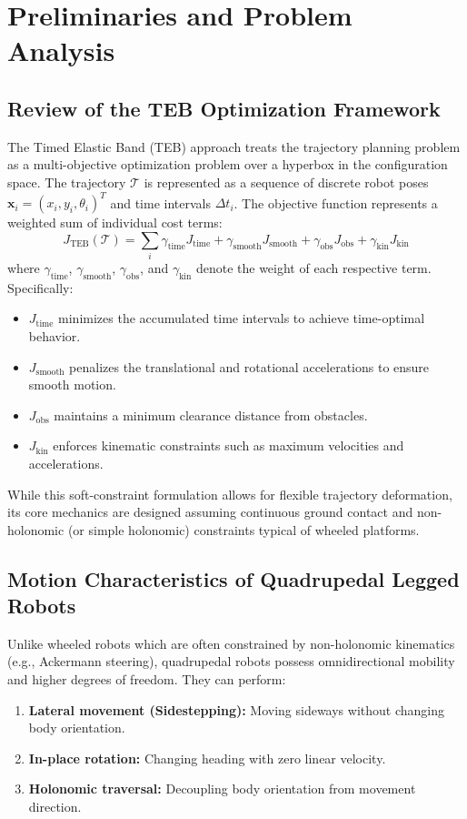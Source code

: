 \documentclass[lettersize,journal]{IEEEtran}
\begin{document}
\section{Preliminaries and Problem Analysis}

\subsection{Review of the TEB Optimization Framework}
The Timed Elastic Band (TEB) approach \cite{rosmannTrajectoryOptimizationUsing2017} treats the trajectory planning problem as a multi-objective optimization problem over a hyperbox in the configuration space. The trajectory $\mathcal{T}$ is represented as a sequence of discrete robot poses $\mathbf{x}_i = (x_i, y_i, \theta_i)^T$ and time intervals $\Delta t_i$. The objective function represents a weighted sum of individual cost terms:
\begin{equation}
J_{\text{TEB}}(\mathcal{T}) = \sum_i \gamma_{\text{time}} J_{\text{time}} + \gamma_{\text{smooth}} J_{\text{smooth}} + \gamma_{\text{obs}} J_{\text{obs}} + \gamma_{\text{kin}} J_{\text{kin}}
\end{equation}
where $\gamma_{\text{time}}$, $\gamma_{\text{smooth}}$, $\gamma_{\text{obs}}$, and $\gamma_{\text{kin}}$ denote the weight of each respective term. Specifically:
\begin{itemize}
\item $J_{\text{time}}$ minimizes the accumulated time intervals to achieve time-optimal behavior.
\item $J_{\text{smooth}}$ penalizes the translational and rotational accelerations to ensure smooth motion.
\item $J_{\text{obs}}$ maintains a minimum clearance distance from obstacles.
\item $J_{\text{kin}}$ enforces kinematic constraints such as maximum velocities and accelerations.
\end{itemize}

While this soft-constraint formulation allows for flexible trajectory deformation, its core mechanics are designed assuming continuous ground contact and non-holonomic (or simple holonomic) constraints typical of wheeled platforms.

\subsection{Motion Characteristics of Quadrupedal Legged Robots}
Unlike wheeled robots which are often constrained by non-holonomic kinematics (e.g., Ackermann steering), quadrupedal robots possess omnidirectional mobility and higher degrees of freedom. They can perform:
\begin{enumerate}
\item \textbf{Lateral movement (Sidestepping):} Moving sideways without changing body orientation.
\item \textbf{In-place rotation:} Changing heading with zero linear velocity.
\item \textbf{Holonomic traversal:} Decoupling body orientation from movement direction.
\end{enumerate}
\end{document}
